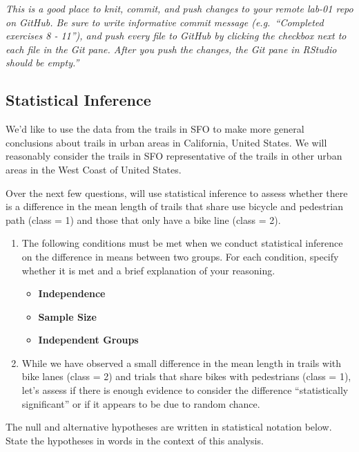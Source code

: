 \documentclass[
]{article}
\providecommand{\tightlist}{%
  \setlength{\itemsep}{0pt}\setlength{\parskip}{0pt}}
\begin{document}
\emph{This is a good place to knit, commit, and push changes to your
remote lab-01 repo on GitHub. Be sure to write informative commit
message (e.g.~``Completed exercises 8 - 11''), and push every file to
GitHub by clicking the checkbox next to each file in the Git pane. After
you push the changes, the Git pane in RStudio should be empty.''}

\hypertarget{statistical-inference}{%
\subsection{Statistical Inference}\label{statistical-inference}}

We'd like to use the data from the trails in SFO to make more general
conclusions about trails in urban areas in California, United States. We
will reasonably consider the trails in SFO representative of the trails
in other urban areas in the West Coast of United States.

Over the next few questions, will use statistical inference to assess
whether there is a difference in the mean length of trails that share
use bicycle and pedestrian path (class = 1) and those that only have a
bike line (class = 2).

\begin{enumerate}
\def\labelenumi{\arabic{enumi}.}
\setcounter{enumi}{11}
\tightlist
\item
  The following conditions must be met when we conduct statistical
  inference on the difference in means between two groups. For each
  condition, specify whether it is met and a brief explanation of your
  reasoning.

  \begin{itemize}
  \tightlist
  \item
    \textbf{Independence}
  \item
    \textbf{Sample Size}
  \item
    \textbf{Independent Groups}
  \end{itemize}
\item
  While we have observed a small difference in the mean length in trails
  with bike lanes (class = 2) and trials that share bikes with
  pedestrians (class = 1), let's assess if there is enough evidence to
  consider the difference ``statistically significant'' or if it appears
  to be due to random chance.
\end{enumerate}

The null and alternative hypotheses are written in statistical notation
below. State the hypotheses in words in the context of this analysis.
\end{document}

